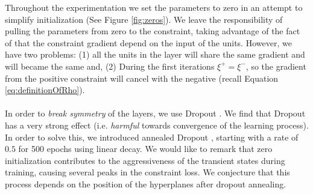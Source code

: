Throughout the experimentation we set the parameters to zero in an attempt to simplify initialization (See Figure \ref{fig:zeros}). We leave the responsibility of pulling the parameters from zero to the constraint, taking advantage of the fact of that the constraint gradient depend on the input of the units. However, we have two problems: (1) all the units in the layer will share the same gradient and will became the same and, (2) During the first iterations $\xi^+ = \xi^-$, so the gradient from the positive constraint will cancel with the negative (recall Equation \ref{eq:definitionOfRho}).
\\\\
In order to \emph{break symmetry} of the layers, we use Dropout \cite{dropout}. We find that Dropout has a very strong effect (i.e. \emph{harmful} towards convergence of the learning process). In order to solve this, we introduced annealed Dropout \cite{dropoutAnnealing}, starting with a rate of $0.5$ for 500 epochs using linear decay. We would like to remark that zero initialization  contributes to the aggressiveness of the transient states during training, causing  several peaks in the constraint loss. We conjecture that this process depends on the position of the hyperplanes after dropout annealing. 

